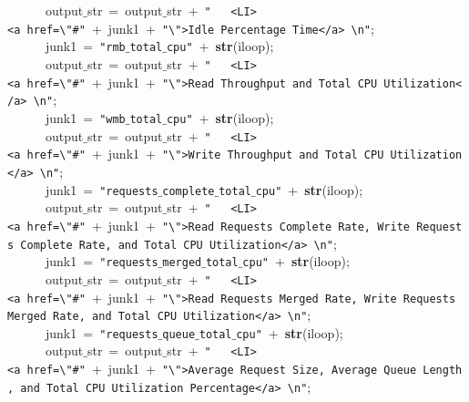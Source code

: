 \mbox{}\ \ \ \ \ \ output$\_$str\ =\ output$\_$str\ +\ \texttt{"{}\ \ \ \textless{}LI\textgreater{}\textless{}a\ href=\textbackslash{}"{}\#"{}}\ +\ junk1\ +\ \texttt{"{}\textbackslash{}"{}\textgreater{}Idle\ Percentage\ Time\textless{}/a\textgreater{}\ \textbackslash{}n"{}}; \\
\mbox{}\ \ \ \ \ \ junk1\ =\ \texttt{"{}rmb$\_$total$\_$cpu"{}}\ +\ \textbf{str}(iloop); \\
\mbox{}\ \ \ \ \ \ output$\_$str\ =\ output$\_$str\ +\ \texttt{"{}\ \ \ \textless{}LI\textgreater{}\textless{}a\ href=\textbackslash{}"{}\#"{}}\ +\ junk1\ +\ \texttt{"{}\textbackslash{}"{}\textgreater{}Read\ Throughput\ and\ Total\ CPU\ Utilization\textless{}/a\textgreater{}\ \textbackslash{}n"{}}; \\
\mbox{}\ \ \ \ \ \ junk1\ =\ \texttt{"{}wmb$\_$total$\_$cpu"{}}\ +\ \textbf{str}(iloop); \\
\mbox{}\ \ \ \ \ \ output$\_$str\ =\ output$\_$str\ +\ \texttt{"{}\ \ \ \textless{}LI\textgreater{}\textless{}a\ href=\textbackslash{}"{}\#"{}}\ +\ junk1\ +\ \texttt{"{}\textbackslash{}"{}\textgreater{}Write\ Throughput\ and\ Total\ CPU\ Utilization\textless{}/a\textgreater{}\ \textbackslash{}n"{}}; \\
\mbox{}\ \ \ \ \ \ junk1\ =\ \texttt{"{}requests$\_$complete$\_$total$\_$cpu"{}}\ +\ \textbf{str}(iloop); \\
\mbox{}\ \ \ \ \ \ output$\_$str\ =\ output$\_$str\ +\ \texttt{"{}\ \ \ \textless{}LI\textgreater{}\textless{}a\ href=\textbackslash{}"{}\#"{}}\ +\ junk1\ +\ \texttt{"{}\textbackslash{}"{}\textgreater{}Read\ Requests\ Complete\ Rate,\ Write\ Requests\ Complete\ Rate,\ and\ Total\ CPU\ Utilization\textless{}/a\textgreater{}\ \textbackslash{}n"{}}; \\
\mbox{}\ \ \ \ \ \ junk1\ =\ \texttt{"{}requests$\_$merged$\_$total$\_$cpu"{}}\ +\ \textbf{str}(iloop); \\
\mbox{}\ \ \ \ \ \ output$\_$str\ =\ output$\_$str\ +\ \texttt{"{}\ \ \ \textless{}LI\textgreater{}\textless{}a\ href=\textbackslash{}"{}\#"{}}\ +\ junk1\ +\ \texttt{"{}\textbackslash{}"{}\textgreater{}Read\ Requests\ Merged\ Rate,\ Write\ Requests\ Merged\ Rate,\ and\ Total\ CPU\ Utilization\textless{}/a\textgreater{}\ \textbackslash{}n"{}}; \\
\mbox{}\ \ \ \ \ \ junk1\ =\ \texttt{"{}requests$\_$queue$\_$total$\_$cpu"{}}\ +\ \textbf{str}(iloop); \\
\mbox{}\ \ \ \ \ \ output$\_$str\ =\ output$\_$str\ +\ \texttt{"{}\ \ \ \textless{}LI\textgreater{}\textless{}a\ href=\textbackslash{}"{}\#"{}}\ +\ junk1\ +\ \texttt{"{}\textbackslash{}"{}\textgreater{}Average\ Request\ Size,\ Average\ Queue\ Length,\ and\ Total\ CPU\ Utilization\ Percentage\textless{}/a\textgreater{}\ \textbackslash{}n"{}}; \\
